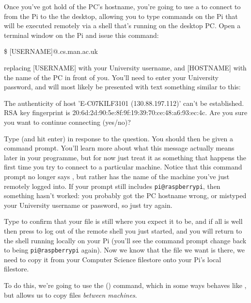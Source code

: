 Once you've got hold of the PC's hostname, you're going to use a  to connect to from the Pi to the the desktop, allowing you to type commands on the Pi that will be executed remotely via a shell that's running on the desktop PC. Open a terminal window on the Pi and issue this command:

\begin{ttoutenv}
\$  [USERNAME]\!@\![HOSTNAME].cs.man.ac.uk
\end{ttoutenv}

replacing [USERNAME] with your University username, and [HOSTNAME] with the name of the PC in front of you. You'll need to enter your University password, and will most likely be presented with text something similar to this:

\begin{ttoutenv}
The authenticity of host 'E-C07KILF3101 (130.88.197.112)' can't be
established.
RSA key fingerprint is 20:6d:2d:90:5e:8f:9f:19:39:70:ce:48:a6:93:ec:4c.
Are you sure you want to continue connecting (yes/no)?
\end{ttoutenv}

Type  (and hit enter) in response to the question. You should then be given a command prompt. You'll learn more about what this message actually means later in your programme, but for now just treat it as something that happens the first time you try to connect to a particular machine. Notice that this command prompt no longer says , but rather has the name of the machine you've just remotely logged into. If your prompt still includes \texttt{pi@raspberrypi}, then something hasn't worked: you probably got the PC hostname wrong, or mistyped your University username or password, so just try again.

Type  to confirm that your  file is still where you expect it to be, and if all is well then press  to log out of the remote shell you just started, and you will return to the shell running locally on your Pi (you'll see the command prompt change back to being \texttt{pi@raspberrypi} again). Now we know that the file we want is there, we need to copy it from your Computer Science filestore onto your Pi's local filestore.

To do this, we're going to use the  () command, which in some ways behaves like , but allows us to copy files \textit{between machines}.


